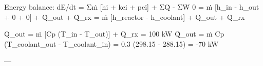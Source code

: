 Energy balance:  
dE/dt = Σṁ [hi + kei + pei] + ΣQ̇ - ΣẆ  
0 = ṁ [h_in - h_out + 0 + 0] + Q̇_out + Q̇_rx  
= ṁ [h_reactor - h_coolant] + Q̇_out + Q̇_rx  

Q̇_out = ṁ [Cp (T_in - T_out)] + Q̇_rx = 100 kW  
Q̇_out = ṁ Cp (T_coolant_out - T_coolant_in) = 0.3 (298.15 - 288.15) = -70 kW  

---